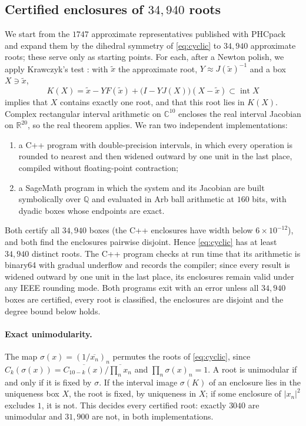 \documentclass[11pt]{article}
\theoremstyle{definition}
\theoremstyle{remark}
\newcommand{\C}{\mathbb{C}}
\newcommand{\Q}{\mathbb{Q}}
\begin{document}
\subsection{\texorpdfstring{Certified enclosures of $34{,}940$ roots}{Certified enclosures of 34,940 roots}}\label{sec:enclosures}
We start from the $1747$ approximate representatives published with PHCpack \cite{PHCpack} and expand them by the
dihedral symmetry of \eqref{eq:cyclic} to $34{,}940$ approximate roots; these serve only as starting points. For each,
after a Newton polish, we apply Krawczyk's test \cite{Krawczyk1969,Moore1977,Rump1983}: with $\tilde x$ the approximate
root, $Y\approx J(\tilde x)^{-1}$ and a box $X\ni\tilde x$,
\[
K(X)=\tilde x-YF(\tilde x)+\bigl(I-YJ(X)\bigr)(X-\tilde x)\subset\operatorname{int}X
\]
implies that $X$ contains exactly one root, and that this root lies in $K(X)$. Complex rectangular interval
arithmetic on $\C^{10}$ encloses the real interval Jacobian on $\mathbb R^{20}$, so the real theorem applies. We ran
two independent implementations:
\begin{enumerate}[label=(\arabic*)]
\item a C++ program with double-precision intervals, in which every operation is rounded to nearest and then widened
  outward by one unit in the last place, compiled without floating-point contraction;
\item a SageMath program \cite{Sage} in which the system and its Jacobian are built symbolically over $\Q$ and
  evaluated in Arb ball arithmetic \cite{Arb} at $160$ bits, with dyadic boxes whose endpoints are exact.
\end{enumerate}
Both certify all $34{,}940$ boxes (the C++ enclosures have width below $6\times10^{-12}$), and both find the
enclosures pairwise disjoint. Hence \eqref{eq:cyclic} has at least $34{,}940$ distinct roots. The C++ program checks
at run time that its arithmetic is binary64 with gradual underflow and records the compiler; since every result is
widened outward by one unit in the last place, its enclosures remain valid under any IEEE rounding mode. Both programs
exit with an error unless all $34{,}940$ boxes
are certified, every root is classified, the enclosures are disjoint and the degree bound below holds.

\paragraph{Exact unimodularity.} The map $\sigma(x)=(1/\overline{x_n})_n$ permutes the roots of \eqref{eq:cyclic},
since $C_k(\sigma(x))=\overline{C_{10-k}(x)}\big/\overline{\textstyle\prod_nx_n}$ and $\prod_n\sigma(x)_n=1$. A root is
unimodular if and only if it is fixed by $\sigma$. If the interval image $\sigma(K)$ of an enclosure lies in the
uniqueness box $X$, the root is fixed, by uniqueness in $X$; if some enclosure of $|x_n|^2$ excludes $1$, it is not.
This decides every certified root: exactly $3040$ are unimodular and $31{,}900$ are not, in both implementations.
\end{document}

